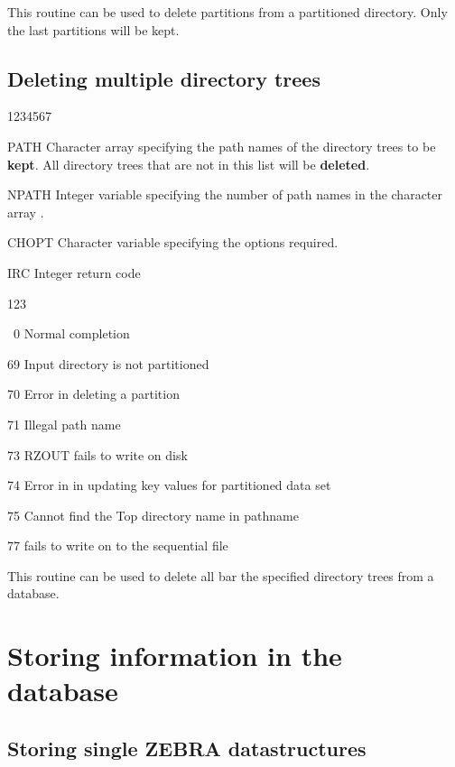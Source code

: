 This routine can be used to delete partitions from a
partitioned directory. Only the last 
partitions will be kept.


\subsection{Deleting multiple directory trees}


\begin{DLtt}{1234567}
\item[PATH]Character array specifying the path names
  of the directory trees to be {\bf kept}. All directory
  trees that are not in this list will be {\bf deleted}.
\item[NPATH]Integer variable specifying the number of path
  names in the character array .
\item[CHOPT]Character variable specifying the options required.
\item[IRC]Integer return code
    \begin{DLtt}{123}
    \item[\ 0]Normal completion
    \item[69]Input directory is not partitioned
    \item[70]Error in deleting a partition
    \item[71]Illegal path name
    \item[73]RZOUT fails to write on disk
    \item[74]Error in  in updating key values for
      partitioned data set
    \item[75]Cannot find the Top directory name in pathname
    \item[77] fails to write on to the sequential file
\end{DLtt}
\end{DLtt}

This routine can be used to delete all bar the specified directory
trees from a database.

\section{Storing information in the database}

\subsection{Storing single ZEBRA datastructures}

